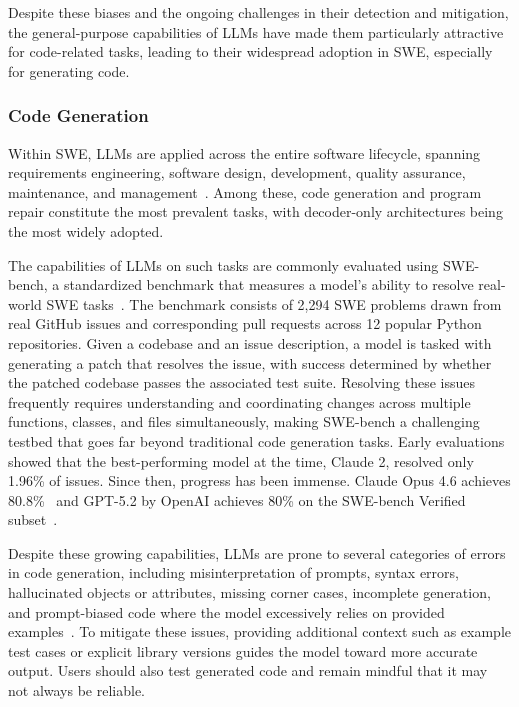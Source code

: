 \documentclass[
english,                 %
bibtex,                  %
]{kththesis}
\numberwithin{listing}{chapter}
\begin{document}
Despite these biases and the ongoing challenges in their detection and mitigation, the general-purpose capabilities of \glspl{LLM} have made them particularly attractive for code-related tasks, leading to their widespread adoption in \gls{SWE}, especially for generating code.

\subsubsection{Code Generation}
\label{sec:bg_codegen}

Within \gls{SWE}, \glspl{LLM} are applied across the entire software lifecycle, spanning requirements engineering, software design, development, quality assurance, maintenance, and management~\cite{hou_large_2024}. Among these, code generation and program repair constitute the most prevalent tasks, with decoder-only architectures being the most widely adopted.

The capabilities of \glspl{LLM} on such tasks are commonly evaluated using \gls{SWE}-bench, a standardized benchmark that measures a model's ability to resolve real-world \gls{SWE} tasks~\cite{jimenez_swe-bench_2024}. The benchmark consists of 2,294 \gls{SWE} problems drawn from real GitHub issues and corresponding pull requests across 12 popular Python repositories. Given a codebase and an issue description, a model is tasked with generating a patch that resolves the issue, with success determined by whether the patched codebase passes the associated test suite. Resolving these issues frequently requires understanding and coordinating changes across multiple functions, classes, and files simultaneously, making \gls{SWE}-bench a challenging testbed that goes far beyond traditional code generation tasks. Early evaluations showed that the best-performing model at the time, Claude 2, resolved only 1.96\% of issues. Since then, progress has been immense. Claude Opus 4.6 achieves 80.8\%~\cite{anthropic_pbc_system_2026} and \gls{GPT}-5.2 by \gls{OpenAI} achieves 80\% on the \gls{SWE}-bench Verified subset~\cite{openai_introducing_2025}.

Despite these growing capabilities, \glspl{LLM} are prone to several categories of errors in code generation, including misinterpretation of prompts, syntax errors, hallucinated objects or attributes, missing corner cases, incomplete generation, and prompt-biased code where the model excessively relies on provided examples~\cite{tambon_bugs_2025}. To mitigate these issues, providing additional context such as example test cases or explicit library versions guides the model toward more accurate output. Users should also test generated code and remain mindful that it may not always be reliable.
\end{document}
